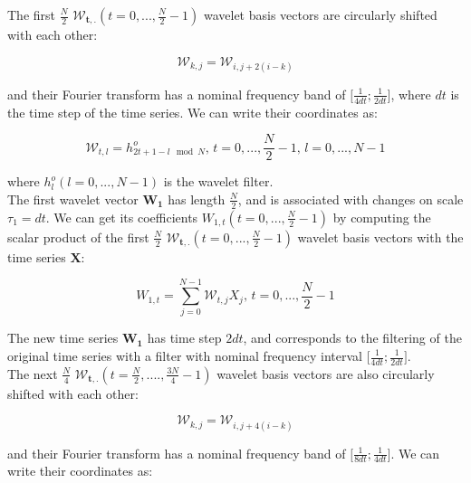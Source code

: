 \documentclass[main.tex]{subfiles}
\begin{document}
The first $\frac{N}{2}$ $\bm{\mathcal{W}_{t , .}} \left( t = 0 , ... , \frac{N}{2} - 1 \right)$ wavelet basis vectors are circularly shifted with each other:

\begin{equation}
\mathcal{W}_{k , j} = \mathcal{W}_{i , j + 2 \left( i - k \right)}
\end{equation}

and their Fourier transform has a nominal frequency band of $\lbrack \frac{1}{4 dt} ; \frac{1}{2 dt} \rbrack$, where $dt$ is the time step of the time series. We can write their coordinates as:

\begin{equation}
\mathcal{W}_{t , l} = h_{2 t + 1 - l \mod N}^o \text{, } t = 0 , ... , \frac{N}{2} - 1 \text{, } l = 0 , ... , N - 1
\end{equation}

where $h_l^o \left( l = 0 , ... , N - 1 \right)$ is the wavelet filter. \\

The first wavelet vector $\bm{W_1}$ has length $\frac{N}{2}$, and is associated with changes on scale $\tau_1 = dt$. We can get its coefficients $W_{1 , t} \left(t = 0 , ... , \frac{N}{2} - 1 \right)$ by computing the scalar product of the first $\frac{N}{2}$ $\bm{\mathcal{W}_{t , .}} \left( t = 0 , ... , \frac{N}{2} - 1 \right)$ wavelet basis vectors with the time series $\bm{X}$:

\begin{equation}
W_{1 , t} = \sum_{j = 0}^{N - 1} \mathcal{W}_{t , j} X_j \text{, } t = 0 , ... , \frac{N}{2} - 1
\end{equation}

The new time series $\bm{W_1}$ has time step $2 dt$, and corresponds to the filtering of the original time series with a filter with nominal frequency interval $\lbrack \frac{1}{4 dt} ; \frac{1}{2 dt} \rbrack$. \\

The next $\frac{N}{4}$ $\bm{\mathcal{W}_{t , .}} \left( t = \frac{N}{2} , .... , \frac{3 N}{4} - 1 \right)$ wavelet basis vectors are also circularly shifted with each other:

\begin{equation}
\mathcal{W}_{k , j} = \mathcal{W}_{i , j + 4 \left( i - k \right)}
\end{equation}

and their Fourier transform has a nominal frequency band of $\lbrack \frac{1}{8 dt} ; \frac{1}{4 dt} \rbrack$. We can write their coordinates as:
\end{document}
